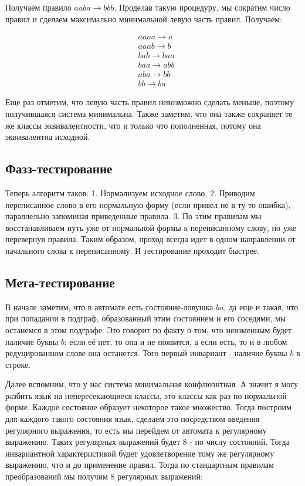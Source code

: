 \documentclass{article}
\begin{document}
Получаем правило $aaba\rightarrow bbb$. Проделав такую процедуру, мы сократим число правил и сделаем максимально минимальной левую часть правил. Получаем:

\begin{align*}
&aaaa \rightarrow a \\
&aaab \rightarrow b \\
&bab \rightarrow baa \\
&baa \rightarrow abb \\
&aba \rightarrow bb \\
&bb \rightarrow ba
\end{align*}

Еще раз отметим, что левую часть правил невозможно сделать меньше, поэтому получившаяся система минимальна. Также заметим, что она также сохраняет те же классы эквивалентности, что и только что пополненная, потому она эквивалентна исходной.

\subsection*{Фазз-тестирование}

Теперь алгоритм таков: 1. Нормализуем исходное слово, 2. Приводим переписанное слово в его нормальную форму (если привел не в ту-то ошибка), параллельно запоминая приведенные правила. 3. По этим правилам мы восстанавливаем путь уже от нормальной формы к переписанному слову, но уже перевернув правила. Таким образом, проход всегда идет в одном направлении-от начального слова к переписанному. И тестирование проходит быстрее.

\subsection*{Мета-тестирование}

В начале заметим, что в автомате есть состояние-ловушка $ba$, да еще и такая, что при попадании в подграф, образованный этим состоянием и его соседями, мы останемся в этом подграфе. Это говорит по факту о том, что неизменным будет наличие буквы $b$: если её нет, то она и не появится, а если есть, то и в любом редуцированном слове она останется. Того первый инвариант - наличие буквы $b$ в строке.

Далее вспомним, что у нас система минимальная конфлюэнтная. А значит я могу разбить язык на непересекающиеся классы, это классы как раз по нормальной форме. Каждое состояние образует некоторое такое множество. Тогда построим для каждого такого состояния язык, сделаем это посредством введения регулярного выражения, то есть мы перейдем от автомата к регулярному выражению. Таких регулярных выражений будет 8 - по числу состояний. Тогда инвариантной характеристикой будет удовлетворение тому же регулярному выражению, что и до применение правил. Тогда по стандартным правилам преобразований мы получим 8 регулярных выражений:
\end{document}
